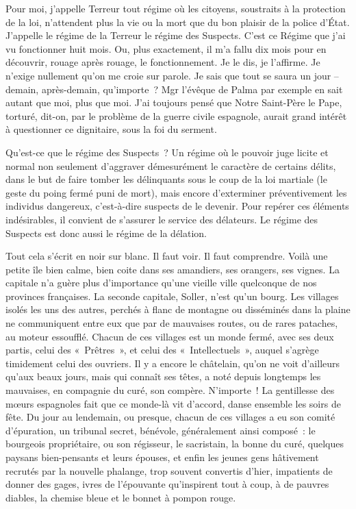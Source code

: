 \documentclass[french,twoside]{book} %
\begin{document}
\bigbreak
\noindent Pour moi, j’appelle Terreur tout régime où les citoyens, soustraits à la protection de la loi, n’attendent plus la vie ou la mort que du bon plaisir de la police d’État. J’appelle le régime de la Terreur le régime des Suspects. C’est ce Régime que j’ai vu fonctionner huit mois. Ou, plus exactement, il m’a fallu dix mois pour en découvrir, rouage après rouage, le fonctionnement. Je le dis, je l’affirme. Je n’exige nullement qu’on me croie sur parole. Je sais que tout se saura un jour – demain, après-demain, qu’importe ? Mgr l’évêque de Palma par exemple en sait autant que moi, plus que moi. J’ai toujours pensé que Notre Saint-Père le Pape, torturé, dit-on, par le problème de la guerre civile espagnole, aurait grand intérêt à questionner ce dignitaire, sous la foi du serment.\par
Qu’est-ce que le régime des Suspects ? Un régime où le pouvoir juge licite et normal non seulement d’aggraver démesurément le caractère de certains délits, dans le but de faire tomber les délinquants sous le coup de la loi martiale (le geste du poing fermé puni de mort), mais encore d’exterminer préventivement les individus dangereux, c’est-à-dire suspects de le devenir. Pour repérer ces éléments indésirables, il convient de s’assurer le service des délateurs. Le régime des Suspects est donc aussi le régime de la délation.\par
Tout cela s’écrit en noir sur blanc. Il faut voir. Il faut comprendre. Voilà une petite île bien calme, bien coite dans ses amandiers, ses orangers, ses vignes. La capitale n’a guère plus d’importance qu’une vieille ville quelconque de nos provinces françaises. La seconde capitale, Soller, n’est qu’un bourg. Les villages isolés les uns des autres, perchés à flanc de montagne ou disséminés dans la plaine ne communiquent entre eux que par de mauvaises routes, ou de rares pataches, au moteur essoufflé. Chacun de ces villages est un monde fermé, avec ses deux partis, celui des « Prêtres », et celui des « Intellectuels », auquel s’agrège timidement celui des ouvriers. Il y a encore le châtelain, qu’on ne voit d’ailleurs qu’aux beaux jours, mais qui connaît ses têtes, a noté depuis longtemps les mauvaises, en compagnie du curé, son compère. N’importe ! La gentillesse des mœurs espagnoles fait que ce monde-là vit d’accord, danse ensemble les soirs de fête. Du jour au lendemain, ou presque, chacun de ces villages a eu son comité d’épuration, un tribunal secret, bénévole, généralement ainsi composé : le bourgeois propriétaire, ou son régisseur, le sacristain, la bonne du curé, quelques paysans bien-pensants et leurs épouses, et enfin les jeunes gens hâtivement recrutés par la nouvelle phalange, trop souvent convertis d’hier, impatients de donner des gages, ivres de l’épouvante qu’inspirent tout à coup, à de pauvres diables, la chemise bleue et le bonnet à pompon rouge.\par
\end{document}
